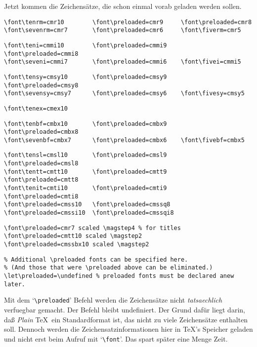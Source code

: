 \begin{appendix}
Jetzt kommen die Zeichens\"atze, die schon einmal vorab geladen werden
sollen.
\begin{verbatim}
\font\tenrm=cmr10        \font\preloaded=cmr9     \font\preloaded=cmr8
\font\sevenrm=cmr7       \font\preloaded=cmr6     \font\fiverm=cmr5
\end{verbatim}
\begin{verbatim}
\font\teni=cmmi10        \font\preloaded=cmmi9    \font\preloaded=cmmi8
\font\seveni=cmmi7       \font\preloaded=cmmi6    \font\fivei=cmmi5
\end{verbatim}
\begin{verbatim}
\font\tensy=cmsy10       \font\preloaded=cmsy9    \font\preloaded=cmsy8
\font\sevensy=cmsy7      \font\preloaded=cmsy6    \font\fivesy=cmsy5
\end{verbatim}
\begin{verbatim}
\font\tenex=cmex10
\end{verbatim}
\begin{verbatim}
\font\tenbf=cmbx10       \font\preloaded=cmbx9    \font\preloaded=cmbx8
\font\sevenbf=cmbx7      \font\preloaded=cmbx6    \font\fivebf=cmbx5
\end{verbatim}
\begin{verbatim}
\font\tensl=cmsl10       \font\preloaded=cmsl9    \font\preloaded=cmsl8
\font\tentt=cmtt10       \font\preloaded=cmtt9    \font\preloaded=cmtt8
\font\tenit=cmti10       \font\preloaded=cmti9    \font\preloaded=cmti8
\font\preloaded=cmss10   \font\preloaded=cmssq8
\font\preloaded=cmssi10  \font\preloaded=cmssqi8
\end{verbatim}
\begin{verbatim}
\font\preloaded=cmr7 scaled \magstep4 % for titles
\font\preloaded=cmtt10 scaled \magstep2
\font\preloaded=cmssbx10 scaled \magstep2
\end{verbatim}
\begin{verbatim}
% Additional \preloaded fonts can be specified here.
% (And those that were \preloaded above can be eliminated.)
\let\preloaded=\undefined % preloaded fonts must be declared anew later.
\end{verbatim}
Mit dem `\verb|\preloaded|' Befehl werden die Zeichens\"atze nicht {\em
tatsaechlich} verfuegbar gemacht. Der Befehl bleibt undefiniert. Der
Grund daf\"ur liegt darin, da\ss{} {\em Plain} \TeX\ ein Standardformat ist,
das nicht zu viele Zeichens\"atze enthalten soll. Dennoch werden die
Zeichensatzinformationen hier in \TeX's Speicher geladen und nicht
erst beim Aufruf mit `\verb|\font|'. Das spart sp\"ater eine Menge Zeit.


\end{appendix}
